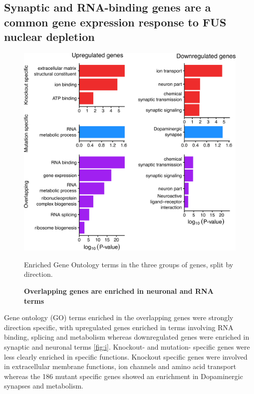 \subsection{Synaptic and RNA-binding genes are a common gene expression response to FUS nuclear depletion}

\begin{figure}[h!]
	\centering
	\includegraphics[width=12cm]{Figures/06_fus_meta/expression_curated_go_terms.png}
	\caption{\textbf{Overlapping genes are enriched in neuronal and RNA terms} }	
	Enriched Gene Ontology terms in the three groups of genes, split by direction.
	\label{fig:fus_expression_go}
\end{figure}


Gene ontology (GO) terms enriched in the overlapping genes were strongly direction specific, with upregulated genes enriched in terms involving RNA binding, splicing and metabolism whereas downregulated genes were enriched in synaptic and neuronal terms \ref{fig:i}.
Knockout- and mutation- specific genes were less clearly enriched in specific functions. Knockout specific genes were involved in extracellular membrane functions, ion channels and amino acid transport whereas the 186 mutant specific genes showed an enrichment in Dopaminergic synapses and metabolism.


